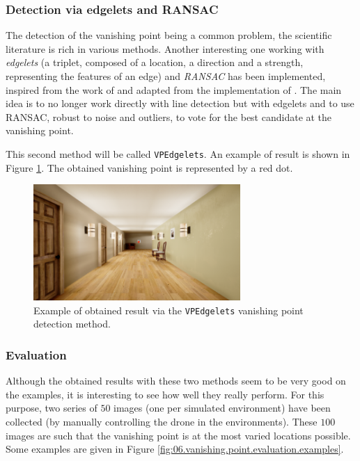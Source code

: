 \subsubsection{Detection via edgelets and RANSAC}

The detection of the vanishing point being a common problem, the scientific literature is rich in various methods. Another interesting one working with \emph{edgelets} (a triplet, composed of a location, a direction and a strength, representing the features of an edge) and \emph{RANSAC} has been implemented, inspired from the work of \textcite{chaudhury2014auto} and adapted from the implementation of \cite{github2020automatedrectification}. The main idea is to no longer work directly with line detection but with edgelets and to use RANSAC, robust to noise and outliers, to vote for the best candidate at the vanishing point.

This second method will be called \texttt{VPEdgelets}. An example of result is shown in Figure \ref{fig:06.vpedgelets.example}. The obtained vanishing point is represented by a red dot.

\begin{figure}[H]
    \centering
    \includegraphics[width=0.7\textwidth]{resources/png/06/vanishing-point/vpedgelets.png}
    \caption{Example of obtained result via the \texttt{VPEdgelets} vanishing point detection method.}
    \label{fig:06.vpedgelets.example}
\end{figure}

\subsubsection{Evaluation}

Although the obtained results with these two methods seem to be very good on the examples, it is interesting to see how well they really perform. For this purpose, two series of $\num{50}$ images (one per simulated environment) have been collected (by manually controlling the drone in the environments). These $\num{100}$ images are such that the vanishing point is at the most varied locations possible. Some examples are given in Figure \ref{fig:06.vanishing.point.evaluation.examples}.

